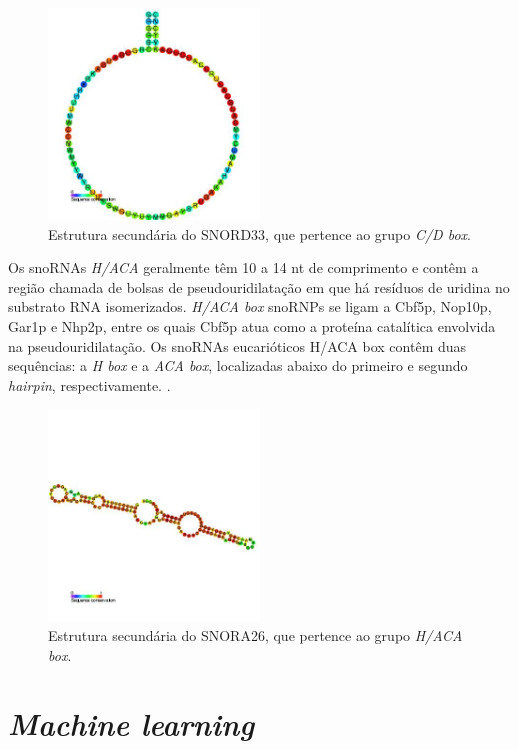 \begin{figure}[h]
    \centering
    \includegraphics[width=0.5\textwidth]{images/snoRNA_c_d_box.jpg}
    \caption{Estrutura secundária do SNORD33, que pertence ao grupo \textit{C/D box}.}
    \label{fig:aminoacidos}
\end{figure}

Os snoRNAs \textit{H/ACA} geralmente têm 10 a 14 nt de comprimento e contêm a região chamada de bolsas de pseudouridilatação em que há resíduos de uridina no substrato RNA isomerizados. \textit{H/ACA box} snoRNPs se ligam a Cbf5p, Nop10p, Gar1p e Nhp2p, entre os quais
Cbf5p atua como a proteína catalítica envolvida na pseudouridilatação. Os snoRNAs eucarióticos H/ACA box contêm duas sequências: a \textit{H box} e a \textit{ACA box}, localizadas abaixo do primeiro e segundo \textit{hairpin}, respectivamente. \cite{snoRNAs-paradigm}.

\begin{figure}[h]
    \centering
    \includegraphics[width=0.5\textwidth]{images/snoRNA_h_aca_box.jpg}
    \caption{Estrutura secundária do SNORA26, que pertence ao grupo \textit{H/ACA box}.}
    \label{fig:aminoacidos}
\end{figure}


\section{\textit{Machine learning}}

